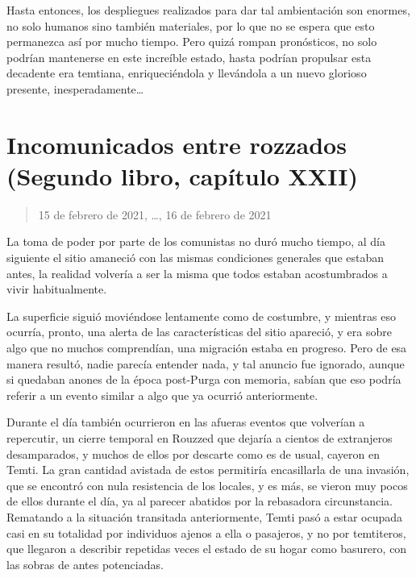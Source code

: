 \documentclass[
]{book}
\begin{document}
Hasta entonces, los despliegues realizados para dar tal ambientación son enormes, no solo humanos sino también materiales, por lo que no se espera que esto permanezca así por mucho tiempo. Pero quizá rompan pronósticos, no solo podrían mantenerse en este increíble estado, hasta podrían propulsar esta decadente era temtiana, enriqueciéndola y llevándola a un nuevo glorioso presente, inesperadamente\ldots{}

\hypertarget{incomunicados-entre-rozzados-segundo-libro-capuxedtulo-xxii}{%
\section{Incomunicados entre rozzados (Segundo libro, capítulo XXII)}\label{incomunicados-entre-rozzados-segundo-libro-capuxedtulo-xxii}}

\begin{quote}
15 de febrero de 2021, \ldots, 16 de febrero de 2021
\end{quote}

La toma de poder por parte de los comunistas no duró mucho tiempo, al día siguiente el sitio amaneció con las mismas condiciones generales que estaban antes, la realidad volvería a ser la misma que todos estaban acostumbrados a vivir habitualmente.

La superficie siguió moviéndose lentamente como de costumbre, y mientras eso ocurría, pronto, una alerta de las características del sitio apareció, y era sobre algo que no muchos comprendían, una migración estaba en progreso. Pero de esa manera resultó, nadie parecía entender nada, y tal anuncio fue ignorado, aunque si quedaban anones de la época post-Purga con memoria, sabían que eso podría referir a un evento similar a algo que ya ocurrió anteriormente.

Durante el día también ocurrieron en las afueras eventos que volverían a repercutir, un cierre temporal en Rouzzed que dejaría a cientos de extranjeros desamparados, y muchos de ellos por descarte como es de usual, cayeron en Temti. La gran cantidad avistada de estos permitiría encasillarla de una invasión, que se encontró con nula resistencia de los locales, y es más, se vieron muy pocos de ellos durante el día, ya al parecer abatidos por la rebasadora circunstancia. Rematando a la situación transitada anteriormente, Temti pasó a estar ocupada casi en su totalidad por individuos ajenos a ella o pasajeros, y no por temtiteros, que llegaron a describir repetidas veces el estado de su hogar como basurero, con las sobras de antes potenciadas.
\end{document}

